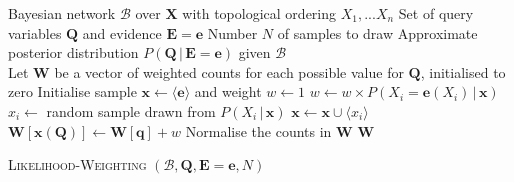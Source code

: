 \begin{algorithm}[h]
\begin{algorithmic} \vspace{2mm} 
\REQUIRE Bayesian network $\mathcal{B}$ over $\mathbf{X}$ with topological ordering $X_1,...X_n$
\REQUIRE Set of query variables $\mathbf{Q}$ and evidence $\mathbf{E} =\mathbf{e}$
\REQUIRE Number $N$ of samples to draw
\ENSURE Approximate posterior distribution $P(\mathbf{Q} \, | \, \mathbf{E} =\mathbf{e})$ given $\mathcal{B}$ \\[2mm]
\STATE Let $\mathbf{W}$ be a vector of weighted counts for each possible value for $\mathbf{Q}$, initialised to zero
\STATE Initialise sample $\mathbf{x} \leftarrow \langle \mathbf{e} \rangle$ and weight $w \leftarrow 1$
\STATE $w \leftarrow w \times P\left(X_i = \mathbf{e}(X_i)  \, | \,  \mathbf{x}\right)$
\ELSE
\STATE $x_i \leftarrow$ random sample drawn from $P(X_i  \, | \,  \mathbf{x})$
\STATE $\mathbf{x} \leftarrow \mathbf{x} \cup \langle x_i \rangle$
\ENDIF
\ENDFOR
\STATE $\mathbf{W}[\mathbf{x}(\mathbf{Q})] \leftarrow \mathbf{W}[\mathbf{q}] + w$
\ENDFOR
\STATE Normalise the counts in $\mathbf{W}$
\RETURN $\mathbf{W}$  \vspace{1mm} 
\end{algorithmic}
\caption{\textsc{Likelihood-Weighting} $(\mathcal{B},\mathbf{Q}, \mathbf{E}=\mathbf{e}, N)$}
\label{algo:lw}
\end{algorithm}

